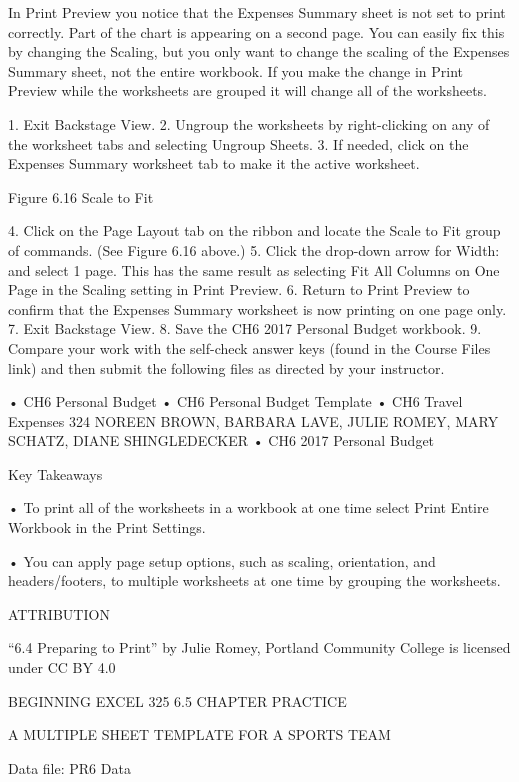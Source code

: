 In Print Preview you notice that the Expenses Summary sheet is not set to print correctly. Part of
the chart is appearing on a second page. You can easily fix this by changing the Scaling, but you only
want to change the scaling of the Expenses Summary sheet, not the entire workbook. If you make
the change in Print Preview while the worksheets are grouped it will change all of the worksheets.

1. Exit Backstage View.
2. Ungroup the worksheets by right-clicking on any of the worksheet tabs and selecting Ungroup
Sheets.
3. If needed, click on the Expenses Summary worksheet tab to make it the active worksheet.




Figure 6.16 Scale to Fit


4. Click on the Page Layout tab on the ribbon and locate the Scale to Fit group of commands. (See
Figure 6.16 above.)
5. Click the drop-down arrow for Width: and select 1 page. This has the same result as selecting Fit
All Columns on One Page in the Scaling setting in Print Preview.
6. Return to Print Preview to confirm that the Expenses Summary worksheet is now printing on
one page only.
7. Exit Backstage View.
8. Save the CH6 2017 Personal Budget workbook.
9. Compare your work with the self-check answer keys (found in the Course Files link) and then
submit the following files as directed by your instructor.

• CH6 Personal Budget
• CH6 Personal Budget Template
• CH6 Travel Expenses
324 NOREEN BROWN, BARBARA LAVE, JULIE ROMEY, MARY SCHATZ, DIANE SHINGLEDECKER
• CH6 2017 Personal Budget


Key Takeaways


• To print all of the worksheets in a workbook at one time select Print Entire Workbook in the Print Settings.

• You can apply page setup options, such as scaling, orientation, and headers/footers, to multiple worksheets
at one time by grouping the worksheets.



ATTRIBUTION

“6.4 Preparing to Print” by Julie Romey, Portland Community College is licensed under CC BY 4.0




BEGINNING EXCEL 325
6.5 CHAPTER PRACTICE




A MULTIPLE SHEET TEMPLATE FOR A SPORTS TEAM

Data file: PR6 Data

